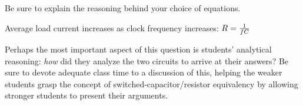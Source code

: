 Be sure to explain the reasoning behind your choice of equations.







Average load current increases as clock frequency increases: $R = {1 \over fC}$







Perhaps the most important aspect of this question is students' analytical reasoning: {\it how} did they analyze the two circuits to arrive at their answers?  Be sure to devote adequate class time to a discussion of this, helping the weaker students grasp the concept of switched-capacitor/resistor equivalency by allowing stronger students to present their arguments.
 



